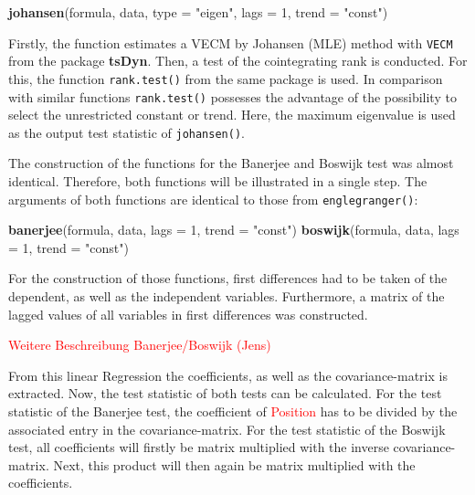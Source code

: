 \documentclass[11pt,a4paper]{article}
\newenvironment{Shaded}{\begin{snugshade}}{\end{snugshade}}
\newcommand{\DataTypeTok}[1]{\textcolor[rgb]{0.13,0.29,0.53}{#1}}
\newcommand{\DecValTok}[1]{\textcolor[rgb]{0.00,0.00,0.81}{#1}}
\newcommand{\KeywordTok}[1]{\textcolor[rgb]{0.13,0.29,0.53}{\textbf{#1}}}
\newcommand{\NormalTok}[1]{#1}
\newcommand{\StringTok}[1]{\textcolor[rgb]{0.31,0.60,0.02}{#1}}
\begin{document}
\begin{Shaded}
\begin{Highlighting}[]
\KeywordTok{johansen}\NormalTok{(formula, data, }\DataTypeTok{type =} \StringTok{"eigen"}\NormalTok{, }\DataTypeTok{lags =} \DecValTok{1}\NormalTok{, }\DataTypeTok{trend =} \StringTok{"const"}\NormalTok{)}
\end{Highlighting}
\end{Shaded}

Firstly, the function estimates a VECM by Johansen (MLE) method with
\texttt{VECM} from the package \textbf{tsDyn}. Then, a test of the
cointegrating rank is conducted. For this, the function
\texttt{rank.test()} from the same package is used. In comparison with
similar functions \texttt{rank.test()} possesses the advantage of the
possibility to select the unrestricted constant or trend. Here, the
maximum eigenvalue is used as the output test statistic of
\texttt{johansen()}.

The construction of the functions for the Banerjee and Boswijk test was
almost identical. Therefore, both functions will be illustrated in a
single step. The arguments of both functions are identical to those from
\texttt{englegranger()}:

\begin{Shaded}
\begin{Highlighting}[]
\KeywordTok{banerjee}\NormalTok{(formula, data, }\DataTypeTok{lags =} \DecValTok{1}\NormalTok{, }\DataTypeTok{trend =} \StringTok{"const"}\NormalTok{)}
\KeywordTok{boswijk}\NormalTok{(formula, data, }\DataTypeTok{lags =} \DecValTok{1}\NormalTok{, }\DataTypeTok{trend =} \StringTok{"const"}\NormalTok{)}
\end{Highlighting}
\end{Shaded}

For the construction of those functions, first differences had to be
taken of the dependent, as well as the independent variables.
Furthermore, a matrix of the lagged values of all variables in first
differences was constructed.

\textcolor{red}{Weitere Beschreibung Banerjee/Boswijk (Jens)}

From this linear Regression the coefficients, as well as the
covariance-matrix is extracted. Now, the test statistic of both tests
can be calculated. For the test statistic of the Banerjee test, the
coefficient of \textcolor{red}{Position} has to be divided by the
associated entry in the covariance-matrix. For the test statistic of the
Boswijk test, all coefficients will firstly be matrix multiplied with
the inverse covariance-matrix. Next, this product will then again be
matrix multiplied with the coefficients.
\end{document}
